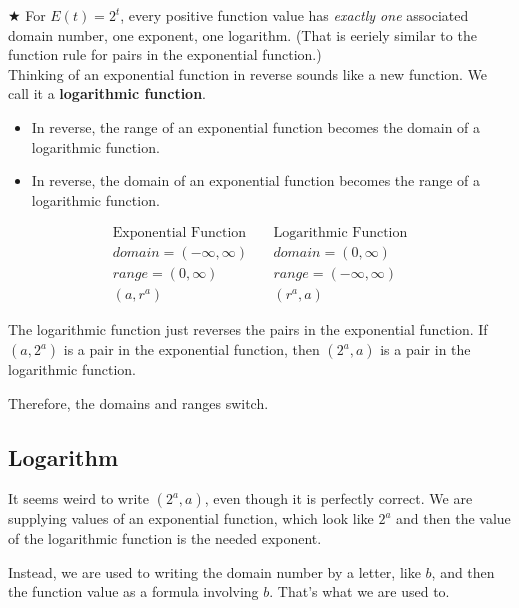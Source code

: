 \documentclass{ximera}
\begin{document}
\textbf{\textcolor{red!90!darkgray}{$\bigstar$}} For $E(t) = 2^t$, every positive function value has \textit{exactly one} associated domain number, one exponent, one logarithm. (That is eeriely similar to the function rule for pairs in the exponential function.) \\ 




Thinking of an exponential function in reverse sounds like a new function. We call it a \textbf{\textcolor{purple!85!blue}{logarithmic function}}.   \\


\begin{itemize}
\item In reverse, the range of an exponential function becomes the domain of a logarithmic function.
\item In reverse, the domain of an exponential function becomes the range of a logarithmic function.
\end{itemize}





\[
\begin{array}{lcl}
\text{Exponential Function}  &     &  \text{Logarithmic Function}  \\
domain = (-\infty, \infty)  &  \   &  domain = (0, \infty)  \\
range = (0, \infty)  &    &  range = (-\infty, \infty)  \\
(a, r^a)    &    &   (r^a, a)
\end{array}
\]


The logarithmic function just reverses the pairs in the exponential function.  If $(a, 2^a)$ is a pair in the exponential function, then $(2^a, a)$ is a pair in the logarithmic function.


Therefore, the domains and ranges switch. \\






\subsection{Logarithm}

It seems weird to write $(2^a, a)$, even though it is perfectly correct.  We are supplying values of an exponential function, which look like $2^a$ and then the value of the logarithmic function is the needed exponent.

Instead, we are used to writing the domain number by a letter, like $b$, and then the function value as a formula involving $b$. That's what we are used to.
\end{document}
